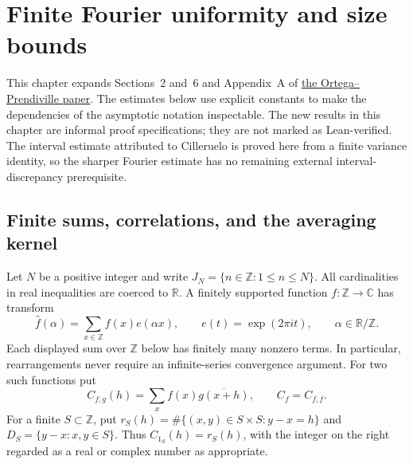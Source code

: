\chapter{Finite Fourier uniformity and size bounds}
\label{core:chapter}

This chapter expands Sections~2 and~6 and Appendix~A of
\href{https://arxiv.org/abs/2110.13447}{the Ortega--Prendiville paper}.
The estimates below use explicit constants to
make the dependencies of the asymptotic notation inspectable.  The new
results in this chapter are informal proof specifications; they are not
marked as Lean-verified.  The interval estimate attributed to Cilleruelo
is proved here from a finite variance identity, so the sharper Fourier
estimate has no remaining external interval-discrepancy prerequisite.

\section{Finite sums, correlations, and the averaging kernel}

\begin{definition}
\label{core:finite-fourier}
Let $N$ be a positive integer and write
$J_N=\{n\in\mathbb Z:1\leq n\leq N\}$.
All cardinalities in real inequalities are coerced to $\mathbb R$.
A finitely supported function $f:\mathbb Z\to\mathbb C$ has transform
\[
 \widehat f(\alpha)=\sum_{x\in\mathbb Z} f(x)e(\alpha x),
 \qquad e(t)=\exp(2\pi i t),\qquad \alpha\in\mathbb R/\mathbb Z.
\]
Each displayed sum over $\mathbb Z$ below has finitely many nonzero
terms.  In particular, rearrangements never require an infinite-series
convergence argument.  For two such functions put
\[
 C_{f,g}(h)=\sum_x f(x)\overline{g(x+h)},\qquad C_f=C_{f,f}.
\]
For a finite $S\subset\mathbb Z$, put
$r_S(h)=\#\{(x,y)\in S\times S:y-x=h\}$ and
$D_S=\{y-x:x,y\in S\}$.
Thus $C_{1_S}(h)=r_S(h)$, with the integer on the right regarded as a
real or complex number as appropriate.
\end{definition}

